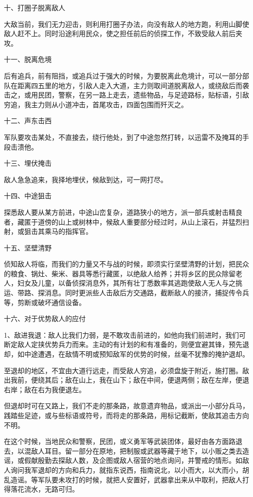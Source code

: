 十、打圈子脱离敌人

大敌当前，我们无力迎击，则利用打圈子办法，向没有敌人的地方跑，利用山脚使敌人赶不上。同时沿途利用民众，使之担任前后的侦探工作，不致受敌人前后夹攻。

十一、脱离危境

后有追兵，前有阻挡，或追兵过于强大的时候，为要脱离此危境计，可以一部分部队在距离四五里的地方，引敌人走入大道，主力则取间道脱离敌人，或绕敌后而袭击之，或用民团，警察，在另一路上走去，遗些物品，与足迹路标，贴标语，引敌穷追，我主力则从小道冲击，首尾攻击，四面包围而歼灭之。

十二、声东击西

军队要攻击某处，不直接去，绕行他处，到了中途忽然打转，以迅雷不及掩耳的手段击溃他。

十三、埋伏掩击

敌人急急追来，我择地埋伏，候敌到达，可一网打尽。

十四、中途狙击

探悉敌人要从某方前进，中途山峦复杂，道路狭小的地方，派一部兵或射击精良者，藏匿于道傍的山上或树林中，候敌人重要部分经过时，从山上滚石，并猛烈扫射，或狙击其乘马的指挥官。

十五、坚壁清野

侦知敌人将临，而我们的力量又不与战的时候，即须实行坚壁清野的计划，把民众的粮食、锅灶、柴米、器具等悉行藏匿，以绝敌人给养；并将乡区的民众除留老人，妇女及儿童，以备侦探消息外，其所有壮丁悉数率其逃跑使敌人无人与之挑运、带路、探消息。同时更派些人击敌后方交通路，截断敌人的接济，捕捉传令兵等，剪断或破坏通信设备。

十六、对于优势敌人的应付

1、敌进我退：敌人比我们力弱，是不敢攻击前进的，如他向我们前进时，我们可断定敌人定挟优势兵力而来。主动的有计划的和有准备的，则便宜避其锋，预先退却，如中途遭遇，在敌情不明或预知敌军的优势的时候，丝毫不犹豫的掩护退却。

至退却的地区，不宜由大道行远走，而受敌人穷追，必须盘旋于附近，施打圈。敌出我前，便绕其后；敌在山上，我在山下；敌在中间，便退两侧；敌在左岸，便退右岸；敌在右为我便退左。

但退却时可在又路上，我们不走的那条路，故意遗弃物品，或派出一小部分兵马，践踏些足迹，或与些标语或符号，而将走的那条路，用标记截断，使敌其追击方向不明。


在这个时候，当地民众和警察，民团，或义勇军等武装团体，最好由各方面路退去，以混敌人耳目。留一部分在原地，把制服或武器等藏于地下，以小贩之类去造谣，或假献殷勤去探敌人数，及企图或敌人宿营的地点询问，并警戒的情形。如敌人询问我军退却的方向和兵力，就指东说西，指南说北，以小而大，以大而小，胡乱造谣。等军队要未攻打的时候，就把人安置好，武器拿出来从中取利，把敌人打得落花流水，无路可归。

